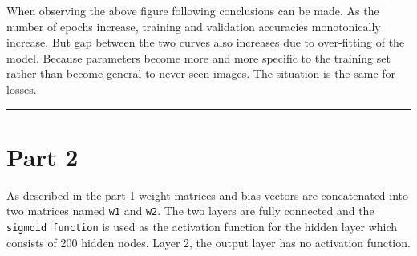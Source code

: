 \documentclass[a4paper,11pt]{article}%
\begin{document}
When observing the above figure following conclusions can be made. As the number of epochs increase, training and validation accuracies monotonically increase. But gap between the two curves also increases due to over-fitting of the model. Because parameters become more and more specific to the training set rather than become general to never seen images. The situation is the same for losses.\\

\hrule
\section*{Part 2}

As described in the part 1 weight matrices and bias vectors are concatenated into two matrices named {\tt w1} and {\tt w2}. The two layers are fully connected and  the {\tt sigmoid function} is used as the activation function for the hidden layer which consists of 200 hidden nodes. Layer 2, the output layer has no activation function.\\
\end{document}
